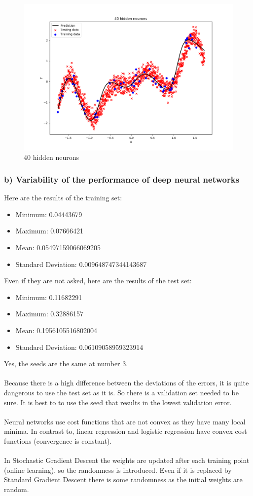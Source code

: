 \begin{figure}[!htbp]
	\centering
        \includegraphics[width=12cm]{1_1_a_40}
	\caption{40 hidden neurons}
\end{figure}
\newpage
\subsubsection*{b) Variability of the performance of deep neural networks}
Here are the results of the training set:
\begin{itemize}
\item Minimum: 0.04443679
\item Maximum: 0.07666421
\item Mean: 0.05497159066069205
\item Standard Deviation: 0.009648747344143687
\end{itemize}
Even if they are not asked, here are the results of the test set:
\begin{itemize}
\item Minimum: 0.11682291
\item Maximum: 0.32886157
\item Mean: 0.1956105516802004
\item Standard Deviation: 0.06109058959323914
\end{itemize}
Yes, the seeds are the same at number 3.\\\\
Because there is a high difference between the deviations of the errors, it is quite dangerous to use the test set as it is. So there is a validation set needed to be sure. It is best to to use the seed that results in the lowest validation error.\\\\
Neural networks use cost functions that are not convex as they have many local minima. In contrast to, linear regression and logistic regression have convex cost functions (convergence is constant).\\\\
In Stochastic Gradient Descent the weights are updated after each training point (online learning), so the randomness is introduced. Even if it is replaced by Standard Gradient Descent there is some randomness as the initial weights are random.


